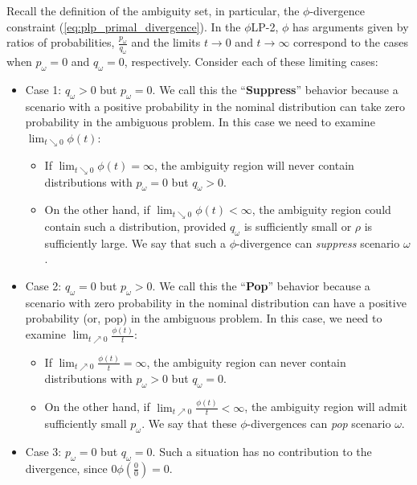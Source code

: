 \documentclass[opre,nonblindrev]{informs3} %
\newcommand{\plp}{$\phi$LP-2}
\begin{document}
Recall the definition of the ambiguity set, in particular, the $\phi$-divergence constraint (\ref{eq:plp_primal_divergence}). 
In the \plp, $\phi$ has arguments given by ratios of probabilities, $\tfrac{p_\omega}{q_\omega}$ and the limits $t \rightarrow 0$ and $t \rightarrow \infty$ correspond to the cases when $p_\omega = 0$ and $q_\omega = 0$, respectively.
Consider each of these limiting cases:
\begin{itemize}
	\item {\sc Case 1:} $q_\omega > 0$ but $p_\omega = 0$.
		We call this the ``{\bf Suppress}'' behavior because a scenario with a positive probability in the nominal distribution can take zero probability in the ambiguous problem. In this case we need to examine $\lim_{t \searrow 0} \phi(t)$:
	\begin{itemize}
		\item If $\lim_{t \searrow 0} \phi(t) = \infty$, the ambiguity region will never contain distributions with $p_\omega = 0$ but $q_\omega > 0$.
		\item On the other hand, if $\lim_{t \searrow 0} \phi(t) < \infty$, the ambiguity region could contain such a distribution, provided $q_\omega$ is sufficiently small or $\rho$ is sufficiently large.
			We say that such a $\phi$-divergence can \emph{suppress} scenario $\omega$.
	\end{itemize}
	\item {\sc Case 2:} $q_\omega = 0$ but $p_\omega > 0$.
		We call this the ``{\bf Pop}'' behavior because a scenario with zero probability in the nominal distribution can have a positive probability (or, pop) in the ambiguous problem. In this case, we need to examine $\lim_{t \nearrow 0} \frac{\phi(t)}{t}$:
	\begin{itemize}
		\item If $\lim_{t \nearrow 0} \frac{\phi(t)}{t} = \infty$, the ambiguity region can never contain distributions with $p_\omega > 0$ but $q_\omega = 0$.
		\item On the other hand, if $\lim_{t \nearrow 0} \frac{\phi(t)}{t} < \infty$, the ambiguity region will admit sufficiently small $p_\omega$.
			We say that these $\phi$-divergences can \emph{pop} scenario $\omega$.
	\end{itemize}
	\item {\sc Case 3:} $p_\omega = 0$ but $q_\omega = 0$.
		Such a situation has no contribution to the divergence, since $0 \phi\left(\tfrac{0}{0}\right) = 0$.
\end{itemize}
\end{document}
